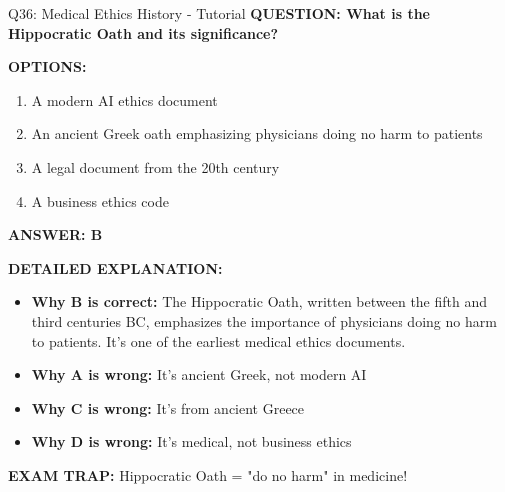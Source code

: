 \documentclass[8pt]{beamer}
\begin{document}
	\begin{frame}{Q36: Medical Ethics History - Tutorial}
		\fontsize{6.5}{7.5}\selectfont
		\textbf{QUESTION: What is the Hippocratic Oath and its significance?}
		
		\vspace{0.1cm}
		\textbf{OPTIONS:}
		\begin{enumerate}
			\item A modern AI ethics document
			\item An ancient Greek oath emphasizing physicians doing no harm to patients
			\item A legal document from the 20th century
			\item A business ethics code
		\end{enumerate}
		
		\vspace{0.1cm}
		\textcolor{myblue}{\textbf{ANSWER: B}}
		
		\vspace{0.1cm}
		\textbf{DETAILED EXPLANATION:}
		\begin{itemize}
			\item \textbf{Why B is correct:} The Hippocratic Oath, written between the fifth and third centuries BC, emphasizes the importance of physicians doing no harm to patients. It's one of the earliest medical ethics documents.
			\item \textbf{Why A is wrong:} It's ancient Greek, not modern AI
			\item \textbf{Why C is wrong:} It's from ancient Greece
			\item \textbf{Why D is wrong:} It's medical, not business ethics
		\end{itemize}
		
		\textcolor{myred}{\textbf{EXAM TRAP:}} Hippocratic Oath = \textcolor{myblue}{"do no harm"} in medicine!
	\end{frame}
	
\end{document}
